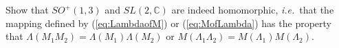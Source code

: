 \documentclass[notes.tex]{subfiles}
\begin{document}

\begin{Exercise}[]
Show that $SO^+(1,3)$ and $SL(2, \mathbb{C})$ are indeed homomorphic, {\it i.e.}\ that the mapping defined by (\ref{eq:LambdaofM}) or (\ref{eq:MofLambda}) has the property that $\Lambda(M_1M_2)=\Lambda(M_1)\Lambda(M_2)$ or $M(\Lambda_1\Lambda_2)=M(\Lambda_1)M(\Lambda_2)$.
\end{Exercise}
\end{document}
